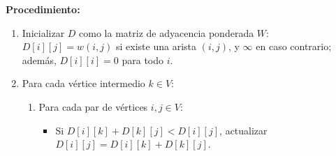         \textbf{Procedimiento:}
        \begin{enumerate}
            \item Inicializar $D$ como la matriz de adyacencia ponderada $W$: $D[i][j] = w(i,j)$ si existe una arista $(i,j)$, y $\infty$ en caso contrario; además, $D[i][i]=0$ para todo $i$.
            \item Para cada vértice intermedio $k \in V$:
            \begin{enumerate}
                \item Para cada par de vértices $i, j \in V$:
                \begin{itemize}
                    \item Si $D[i][k] + D[k][j] < D[i][j]$, actualizar $D[i][j] = D[i][k] + D[k][j]$.
                \end{itemize}
            \end{enumerate}
        \end{enumerate}
